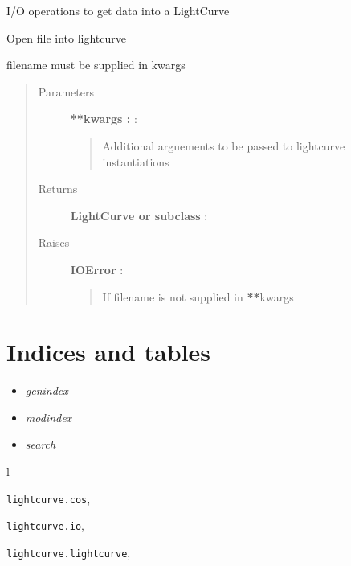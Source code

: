\documentclass[letterpaper,10pt,english]{sphinxmanual}
\begin{document}
\label{index:module-lightcurve.io}
I/O operations to get data into a LightCurve

\begin{fulllineitems}
\label{index:lightcurve.io.open}
Open file into lightcurve

filename must be supplied in kwargs
\begin{quote}\begin{description}
\item[{Parameters }] \leavevmode
\textbf{**kwargs :} :
\begin{quote}

Additional arguements to be passed to lightcurve instantiations
\end{quote}

\item[{Returns }] \leavevmode
\textbf{LightCurve or subclass} :

\item[{Raises }] \leavevmode
\textbf{IOError} :
\begin{quote}

If filename is not supplied in {\color{red}\bfseries{}**}kwargs
\end{quote}

\end{description}\end{quote}

\end{fulllineitems}



\chapter{Indices and tables}
\label{index:indices-and-tables}\label{index:welcome-to-lightcurve-s-documentation}\begin{itemize}
\item {} 
\emph{genindex}

\item {} 
\emph{modindex}

\item {} 
\emph{search}

\end{itemize}


\renewcommand{\indexname}{Python Module Index}
\begin{theindex}
\def\bigletter#1{{\Large\sffamily#1}\nopagebreak\vspace{1mm}}
\bigletter{l}
\item {\texttt{lightcurve.cos}}, \pageref{index:module-lightcurve.cos}
\item {\texttt{lightcurve.io}}, \pageref{index:module-lightcurve.io}
\item {\texttt{lightcurve.lightcurve}}, \pageref{index:module-lightcurve.lightcurve}
\end{theindex}

\renewcommand{\indexname}{Index}
\printindex
\end{document}
